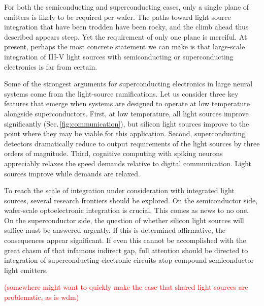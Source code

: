 \documentclass[twocolumn]{article}
\begin{document}
For both the semiconducting and superconducting cases, only a single plane of emitters is likely to be required per wafer. The paths toward light source integration that have been trodden have been rocky, and the climb ahead thus described appears steep. Yet the requirement of only one plane is merciful. At present, perhaps the most concrete statement we can make is that large-scale integration of III-V light sources with semiconducting or superconducting electronics is far from certain. 

Some of the strongest arguments for superconducting electronics in large neural systems come from the light-source ramifications. Let us consider three key features that emerge when systems are designed to operate at low temperature alongside superconductors. First, at low temperature, all light sources improve significantly (Sec.\,\ref{fig:communication}), but silicon light sources improve to the point where they may be viable for this application. Second, superconducting detectors dramatically reduce to output requirements of the light sources by three orders of magnitude. Third, cognitive computing with spiking neurons appreciably relaxes the speed demands relative to digital communication. Light sources improve while demands are relaxed. 

To reach the scale of integration under consideration with integrated light sources, several research frontiers should be explored. On the semiconductor side, wafer-scale optoelectronic integration is crucial. This comes as news to no one. On the superconductor side, the question of whether silicon light sources will suffice must be answered urgently. If this is determined affirmative, the consequences appear significant. If even this cannot be accomplished with the great chasm of that infamous indirect gap, full attention should be directed to integration of superconducting electronic circuits atop compound semiconductor light emitters.

\textcolor{red}{(somewhere might want to quickly make the case that shared light sources are problematic, as is wdm)}

\end{document}
